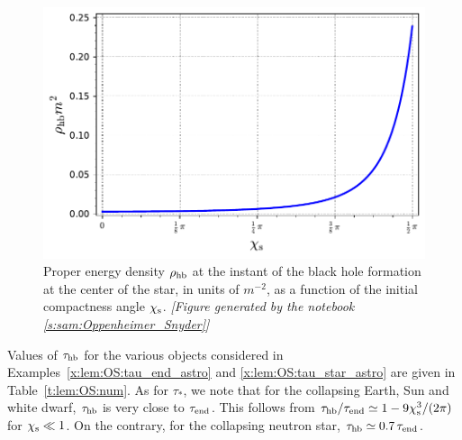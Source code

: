 \begin{figure}
\centerline{
\includegraphics[height=0.35\textheight]{lem_OS_rho_hb.pdf}
}
\caption[]{\label{f:lem:OS:rho_hb} \footnotesize
Proper energy density $\rho_{\rm hb}$ at the instant of the black hole
formation at the center of the star, in units of $m^{-2}$,
as a function of the initial compactness angle $\chi_{\rm s}$.
\textsl{[Figure generated by the notebook \ref{s:sam:Oppenheimer_Snyder}]}
}
\end{figure}

\begin{example} \label{x:lem:OS:tau_hb}
Values of $\tau_{\rm hb}$ for the various objects considered in
Examples~\ref{x:lem:OS:tau_end_astro} and \ref{x:lem:OS:tau_star_astro}
are given in Table~\ref{t:lem:OS:num}. As for $\tau_*$, we note that
for the collapsing Earth, Sun and white dwarf,
$\tau_{\rm hb}$ is very close to $\tau_{\rm end}$. This follows from
$\tau_{\rm hb} / \tau_{\rm end}  \simeq 1 - 9 \chi_{\rm s}^3/(2\pi)$ for $\chi_{\rm s} \ll 1$.
On the contrary, for the collapsing neutron star,
$\tau_{\rm hb} \simeq 0.7 \, \tau_{\rm end}$.
\end{example}


